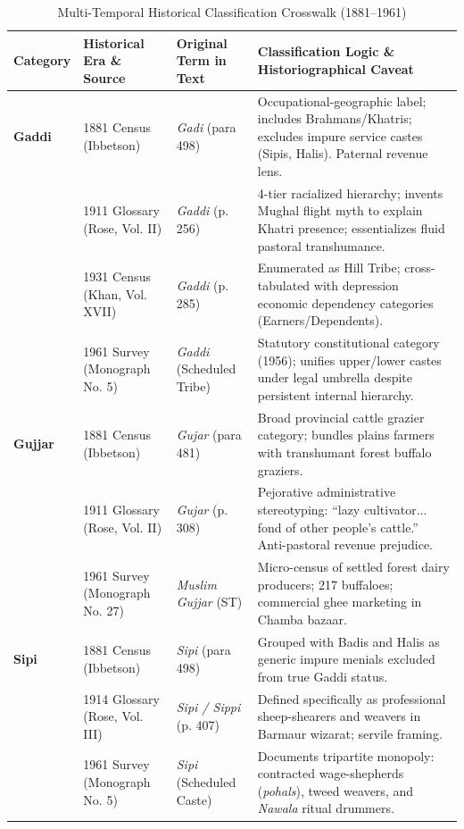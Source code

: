 \documentclass[11pt,a4paper]{article}
\begin{document}
\begin{table}[htbp]
\centering
\footnotesize
\setlength{\tabcolsep}{4pt}
\caption{Multi-Temporal Historical Classification Crosswalk (1881--1961)}
\label{tab:crosswalk}
\begin{tabularx}{\textwidth}{llp{2.8cm}X}
\toprule
\textbf{Category} & \textbf{Historical Era \& Source} & \textbf{Original Term in Text} & \textbf{Classification Logic \& Historiographical Caveat} \\
\midrule
\textbf{Gaddi} & 1881 Census (Ibbetson) & \textit{Gadi} (para 498) & Occupational-geographic label; includes Brahmans/Khatris; excludes impure service castes (Sipis, Halis). Paternal revenue lens. \\
& 1911 Glossary (Rose, Vol. II) & \textit{Gaddi} (p. 256) & 4-tier racialized hierarchy; invents Mughal flight myth to explain Khatri presence; essentializes fluid pastoral transhumance. \\
& 1931 Census (Khan, Vol. XVII) & \textit{Gaddi} (p. 285) & Enumerated as Hill Tribe; cross-tabulated with depression economic dependency categories (Earners/Dependents). \\
& 1961 Survey (Monograph No. 5) & \textit{Gaddi} (Scheduled Tribe) & Statutory constitutional category (1956); unifies upper/lower castes under legal umbrella despite persistent internal hierarchy. \\
\midrule
\textbf{Gujjar} & 1881 Census (Ibbetson) & \textit{Gujar} (para 481) & Broad provincial cattle grazier category; bundles plains farmers with transhumant forest buffalo graziers. \\
& 1911 Glossary (Rose, Vol. II) & \textit{Gujar} (p. 308) & Pejorative administrative stereotyping: ``lazy cultivator... fond of other people's cattle.'' Anti-pastoral revenue prejudice. \\
& 1961 Survey (Monograph No. 27) & \textit{Muslim Gujjar} (ST) & Micro-census of settled forest dairy producers; 217 buffaloes; commercial ghee marketing in Chamba bazaar. \\
\midrule
\textbf{Sipi} & 1881 Census (Ibbetson) & \textit{Sipi} (para 498) & Grouped with Badis and Halis as generic impure menials excluded from true Gaddi status. \\
& 1914 Glossary (Rose, Vol. III) & \textit{Sipi / Sippi} (p. 407) & Defined specifically as professional sheep-shearers and weavers in Barmaur wizarat; servile framing. \\
& 1961 Survey (Monograph No. 5) & \textit{Sipi} (Scheduled Caste) & Documents tripartite monopoly: contracted wage-shepherds (\textit{pohals}), tweed weavers, and \textit{Nawala} ritual drummers. \\

\end{tabularx}
\end{table}
\end{document}
